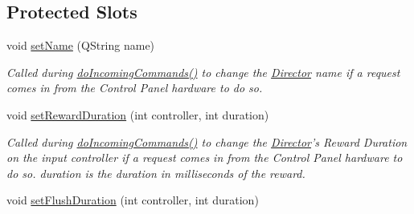 \subsection*{Protected Slots}
\begin{DoxyCompactItemize}
\item 
\hypertarget{class_control_panel_interface_ae46318a58ccdc03dded730924fc04d36}{void \hyperlink{class_control_panel_interface_ae46318a58ccdc03dded730924fc04d36}{set\-Name} (Q\-String name)}\label{class_control_panel_interface_ae46318a58ccdc03dded730924fc04d36}

\begin{DoxyCompactList}\small\item\em Called during \hyperlink{class_control_panel_interface_a405de6656ffb2e4ac404595e783125fb}{do\-Incoming\-Commands()} to change the \hyperlink{class_director}{Director} name if a request comes in from the Control Panel hardware to do so. \end{DoxyCompactList}\item 
\hypertarget{class_control_panel_interface_a255ad635a27089d5523f7efc5cd8c741}{void \hyperlink{class_control_panel_interface_a255ad635a27089d5523f7efc5cd8c741}{set\-Reward\-Duration} (int controller, int duration)}\label{class_control_panel_interface_a255ad635a27089d5523f7efc5cd8c741}

\begin{DoxyCompactList}\small\item\em Called during \hyperlink{class_control_panel_interface_a405de6656ffb2e4ac404595e783125fb}{do\-Incoming\-Commands()} to change the \hyperlink{class_director}{Director}'s Reward Duration on the input controller if a request comes in from the Control Panel hardware to do so. duration is the duration in milliseconds of the reward. \end{DoxyCompactList}\item 
\hypertarget{class_control_panel_interface_a220b8ce8a69430219065cdc215ffb28c}{void \hyperlink{class_control_panel_interface_a220b8ce8a69430219065cdc215ffb28c}{set\-Flush\-Duration} (int controller, int duration)}\label{class_control_panel_interface_a220b8ce8a69430219065cdc215ffb28c}


\end{DoxyCompactItemize}
